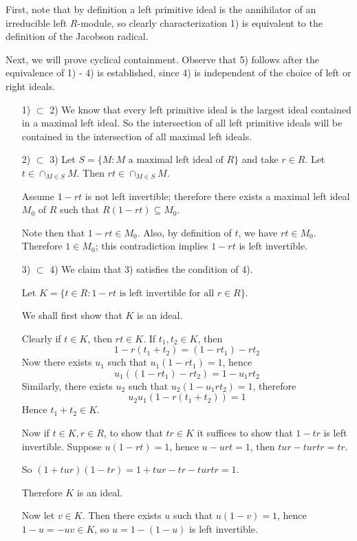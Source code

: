 \documentclass[12pt]{article}
\begin{document}
First, note that by definition a left primitive ideal is the annihilator of an irreducible left $R$-module, so clearly characterization 1) is equivalent to the definition of the Jacobson radical.

Next, we will prove cyclical containment.  Observe that 5) follows after the equivalence of 1) - 4) is established, since 4) is independent of the choice of left or right ideals.

\begin{enumerate}
\item [1) $\subset$ 2)] We know that every left primitive ideal is the
      largest ideal contained in a maximal left ideal.  So the intersection
      of all left primitive ideals will be contained in the intersection of all
      maximal left ideals.
\item [2) $\subset$ 3)] Let
      $S=\{M : M \text{ a maximal left ideal of } R\}$ and take $r \in R$.
      Let $t \in \cap_{M \in S} M$.  Then $rt \in \cap_{M \in S} M$.

      Assume $1-rt$ is not left invertible; therefore there exists a maximal
      left ideal $M_0$ of $R$ such that $R(1-rt) \subseteq M_0$.

      Note then that $1-rt \in M_0$.  Also, by definition of $t$, we have
      $rt \in M_0$.  Therefore $1 \in M_0$; this contradiction implies $1-rt$ is
      left invertible.
\item [3) $\subset$ 4)] We claim that 3) satisfies the condition of 4).

      Let $K=\{t \in R : 1-rt \text{ is left invertible for all } r \in R \}$.

      We shall first show that $K$ is an ideal.

      Clearly if $t \in K$, then $rt \in K$.  
      If $t_1,t_2 \in K$, then \[ 1-r(t_1+t_2)=(1-rt_1)-rt_2 \]
      Now there exists $u_1$ such that $u_1(1-rt_1)=1$, hence
      \[ u_1((1-rt_1)-rt_2)=1-u_1rt_2 \]
      Similarly, there exists $u_2$ such that $u_2(1-u_1rt_2)=1$, therefore
      \[ u_2u_1(1-r(t_1+t_2))=1 \]
      Hence $t_1+t_2 \in K$.

      Now if $t \in K, r \in R$, to show that $tr \in K$ it suffices to
      show that $1-tr$ is left invertible.  Suppose $u(1-rt)=1$, hence
      $u-urt=1$, then $tur-turtr=tr$.

      So $(1+tur)(1-tr)=1+tur-tr-turtr=1$.

      Therefore $K$ is an ideal.

      Now let $v \in K$.  Then there exists $u$ such that $u(1-v)=1$, hence
      $1-u=-uv \in K$, so $u=1-(1-u)$ is left invertible.


\end{enumerate}
\end{document}
